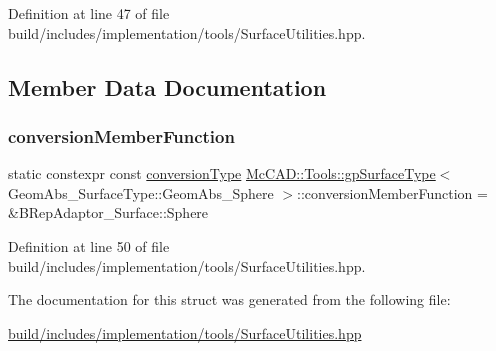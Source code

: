 Definition at line 47 of file build/includes/implementation/tools/\+Surface\+Utilities.\+hpp.



\subsection{Member Data Documentation}
\mbox{\label{structMcCAD_1_1Tools_1_1gpSurfaceType_3_01GeomAbs__SurfaceType_1_1GeomAbs__Sphere_01_4_a2d75bca056002fb224d499a1c3b64dd6}} 
\subsubsection{\texorpdfstring{conversion\+Member\+Function}{conversionMemberFunction}}
{\footnotesize\ttfamily static constexpr const \hyperlink{structMcCAD_1_1Tools_1_1gpSurfaceType_3_01GeomAbs__SurfaceType_1_1GeomAbs__Sphere_01_4_a4a908dc9b85bfc9f6ec822daf9608b5e}{conversion\+Type} \hyperlink{structMcCAD_1_1Tools_1_1gpSurfaceType}{Mc\+C\+A\+D\+::\+Tools\+::gp\+Surface\+Type}$<$ Geom\+Abs\+\_\+\+Surface\+Type\+::\+Geom\+Abs\+\_\+\+Sphere $>$\+::conversion\+Member\+Function = \&B\+Rep\+Adaptor\+\_\+\+Surface\+::\+Sphere\hspace{0.3cm}{\ttfamily [static]}}



Definition at line 50 of file build/includes/implementation/tools/\+Surface\+Utilities.\+hpp.



The documentation for this struct was generated from the following file\+:\begin{DoxyCompactItemize}
\item 
\hyperlink{build_2includes_2implementation_2tools_2SurfaceUtilities_8hpp}{build/includes/implementation/tools/\+Surface\+Utilities.\+hpp}\end{DoxyCompactItemize}
